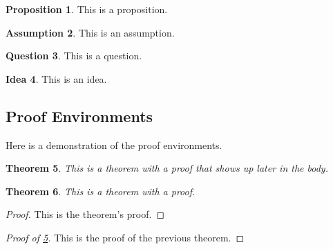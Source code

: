 \documentclass{article}
\theoremstyle{plain}
\newtheorem{theorem}{Theorem}[section]
\theoremstyle{definition}
\newtheorem{assumption}[theorem]{Assumption}
\newtheorem{idea}[theorem]{Idea}
\newtheorem{question}[theorem]{Question}
\newtheorem{proposition}[theorem]{Proposition}
\begin{document}
\begin{proposition}
This is a proposition.
\end{proposition}

\begin{assumption}
This is an assumption.
\end{assumption}

\begin{question}
This is a question.
\end{question}

\begin{idea}
This is an idea.
\end{idea}

\subsection{Proof Environments}

Here is a demonstration of the proof environments.

\begin{theorem}
\label{thm:thm-label}
This is a theorem with a proof that shows up later in the body.
\end{theorem}

\begin{theorem}
This is a theorem with a proof.
\end{theorem}

\begin{proof}
This is the theorem's proof.
\end{proof}

\begin{proof}[Proof of \cref{thm:thm-label}]
This is the proof of the previous theorem.
\end{proof}




\end{document}
